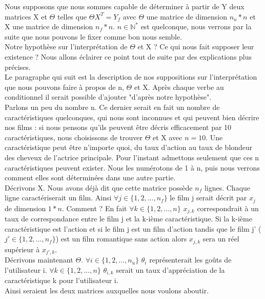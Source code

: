 \documentclass[a4paper,10pt]{article}
\begin{document}
Nous supposons que nous sommes capable de déterminer à partir de Y deux matrices X et $\Theta$ telles que $\Theta X^T = Y_f$ avec $\Theta$ une matrice de dimension $n_u * n$ et X une matrice de dimension $n_f * n$. $n \in \mathbb{N}^*$ est quelconque, nous verrons par la suite que nous pouvons le fixer comme bon nous semble.\\ 
Notre hypothèse sur l'interprétation de $\Theta$ et X ? Ce qui nous fait supposer leur existence ? Nous allons éclairer ce point tout de suite par des explications plus précises.\\

Le paragraphe qui suit est la description de nos suppositions sur l'interprétation que nous pouvons faire à propos de n, $\Theta$ et X. Après chaque verbe au conditionnel il serait possible d'ajouter "d'après notre hypothèse".\\
Parlons un peu du nombre n. Ce dernier serait en fait un nombre de caractéristiques quelconques, qui nous sont inconnues et qui peuvent bien décrire nos films : si nous pensons qu'ils peuvent être décris efficacement par 10 caractéristiques, nous choisissons de trouver $\Theta$ et X avec $n = 10$. 
Une caractéristique peut être n'importe quoi, du taux d'action au taux de blondeur des cheveux de l'actrice principale. Pour l'instant admettons seulement que ces n caractéristiques peuvent exister. Nous les numérotons de 1 à n, puis nous verrons comment elles sont déterminées dans une autre partie.\\
Décrivons X. Nous avons déjà dit que cette matrice possède $n_f$ lignes. Chaque ligne caractériserait un film. Ainsi $\forall j \in \{1, 2, ..., n_f\}$ le film j serait décrit par $x_j$ de dimension $1 * n$. Comment ? En fait $\forall k \in \{1, 2, ..., n\}$ $x_{j,k}$ correspondrait à un taux de correspondance entre le film j et la k-ième caractéristique. Si la k-ième caractéristique est l'action et si le film j est un film d'action tandis que le film j' ($j' \in \{1, 2, ..., n_f\}$) est un film romantique sans action alors $x_{j,k}$ sera un réel supérieur à $x_{j',k}$.\\
Décrivons maintenant $\Theta$. $\forall i \in \{1, 2, ..., n_u\}$ $\theta_{i}$ représenterait les goûts de l'utilisateur i. $\forall k \in \{1, 2, ..., n\}$ $\theta_{i,k}$ serait un taux d'appréciation de la caractéristique k pour l'utilisateur i.\\
Ainsi seraient les deux matrices auxquelles nous voulons aboutir.\\
\end{document}
